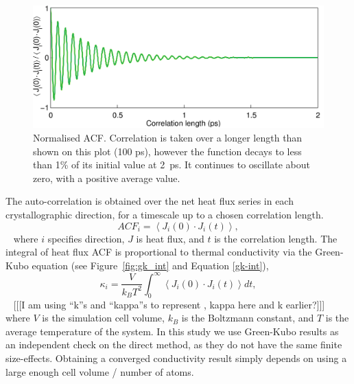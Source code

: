 \begin{figure}[h]
\includegraphics[width=\linewidth]{Figures/gk_acf.png}
\caption{Normalised ACF. Correlation is taken over a longer length than shown on this plot (100 ps), however the function decays to less than 1\% of its initial value at 2~ps. It continues to oscillate about zero, with a positive average value.}
\label{fig:gk_acf}
\end{figure}

The auto-correlation is obtained over the net heat flux series in each crystallographic direction, for a timescale up to a chosen correlation length.
~
\begin{equation}
ACF_i = \left \langle J_i(0) \cdot  J_i(t) \right \rangle,
\label{acf-j}
\end{equation}
~
where $i$ specifies direction, $J$ is heat flux, and $t$ is the correlation length. The integral of heat flux ACF is proportional to thermal conductivity via the Green-Kubo equation (see Figure~\ref{fig:gk_int} and Equation \ref{gk-int}), 
~
\begin{equation}
\kappa_i = \frac{V}{k_{B}T^{2}} \int_{0}^{\infty} \left \langle J_i(0) \cdot  J_i(t) \right \rangle dt ,
\label{gk-int}
\end{equation}
~
[[[I am using ``k''s and ``kappa''s to represent \tc, kappa here and k earlier?]]] where $V$ is the simulation cell volume, $k_B$ is the Boltzmann constant, and $T$ is the average temperature of the system. In this study we use Green-Kubo results as an independent check on the direct method, as they do not have the same finite size-effects. Obtaining a converged conductivity result simply depends on using a large enough cell volume / number of atoms. 


